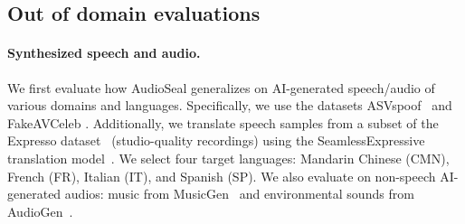 \subsection{Out of domain evaluations}\label{chap4/app:ood}

\paragraph{Synthesized speech and audio.} 
\label{chap4/sec:generalization}
We first evaluate how AudioSeal generalizes on AI-generated speech/audio of various domains and languages. 
Specifically, we use the datasets ASVspoof~\citep{liu2023asvspoof} and FakeAVCeleb \citep{khalid2021fakeavceleb}. 
Additionally, we translate speech samples from a subset of the Expresso dataset~\citep{nguyen2023expresso} (studio-quality recordings) using the SeamlessExpressive translation model~\citep{seamless2023}.
We select four target languages: Mandarin Chinese (CMN), French (FR), Italian (IT), and Spanish (SP). 
We also evaluate on non-speech AI-generated audios: music from MusicGen~\citep{copet2023simple} and environmental sounds from AudioGen~\citep{kreuk2023audiogen}. 


